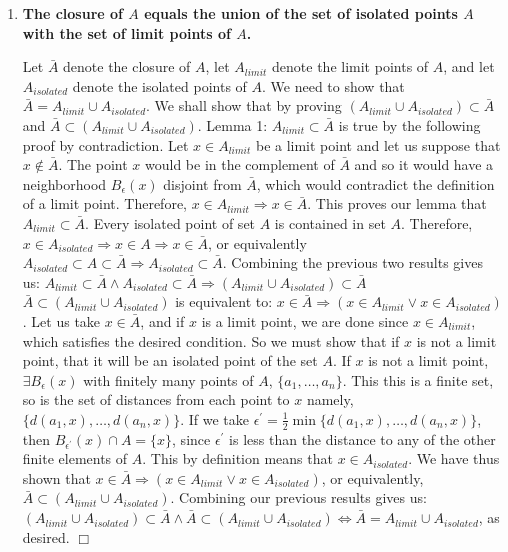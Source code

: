 \documentclass[12pt,letterpaper,reqno]{amsart}
\begin{document}
\begin{enumerate}[1.]
\begin{flushleft}
\end{flushleft}
\item \textbf{The closure of $A$ equals the union of the set of isolated points $A$ with the set of limit points of $A$.}
\begin{flushleft}
    Let $\bar{A}$ denote the closure of $A$, let $A_{limit}$ denote the limit points of $A$, and let $A_{isolated}$ denote the isolated points of $A$. We need to show that $\bar{A} = A_{limit} \cup A_{isolated}$. We shall show that by proving $(A_{limit} \cup A_{isolated}) \subset \bar{A}$ and $\bar{A} \subset (A_{limit} \cup A_{isolated})$. \newline Lemma 1: $A_{limit} \subset \bar{A}$ is true by the following proof by contradiction. Let $x \in A_{limit}$ be a limit point and let us suppose that $x \not\in \bar{A}$. The point $x$ would be in the complement of $\bar{A}$ and so it would have a neighborhood $B_\epsilon(x)$ disjoint from $\bar{A}$, which would contradict the definition of a limit point. Therefore, $x \in A_{limit} \Rightarrow x \in \bar{A}$. This proves our lemma that $A_{limit} \subset \bar{A}$.
    \newline Every isolated point of set $A$ is contained in set $A$. Therefore, $x \in A_{isolated} \Rightarrow x \in A \Rightarrow x \in \bar{A}$, or equivalently $A_{isolated} \subset A \subset \bar{A} \Rightarrow A_{isolated} \subset \bar{A}$. Combining the previous two results gives us: $A_{limit} \subset \bar{A} \wedge A_{isolated} \subset \bar{A} \Rightarrow (A_{limit} \cup A_{isolated}) \subset \bar{A}$
    \newline $\bar{A} \subset (A_{limit} \cup A_{isolated})$ is equivalent to: $x \in \bar{A} \Rightarrow (x \in A_{limit} \vee x \in A_{isolated})$. Let us take $x \in \bar{A}$, and if $x$ is a limit point, we are done since $x \in A_{limit}$, which satisfies the desired condition. So we must show that if $x$ is not a limit point, that it will be an isolated point of the set $A$. If $x$ is not a limit point, $\exists B_\epsilon(x)$ with finitely many points of $A$, $\{a_1, \ldots, a_n\}$. This this is a finite set, so is the set of distances from each point to $x$ namely, $\{d(a_1,x), \ldots, d(a_n, x)\}$. If we take $\epsilon^\prime = \frac{1}{2} \min\{d(a_1,x), \ldots, d(a_n, x)\}$, then $B_{\epsilon^\prime}(x) \cap A = \{x\}$, since $\epsilon^\prime$ is less than the distance to any of the other finite elements of $A$. This by definition means that $x \in A_{isolated}$. We have thus shown that $x \in \bar{A} \Rightarrow (x \in A_{limit} \vee x \in A_{isolated})$, or equivalently, $\bar{A} \subset (A_{limit} \cup A_{isolated})$. Combining our previous results gives us: $(A_{limit} \cup A_{isolated}) \subset \bar{A} \wedge \bar{A} \subset (A_{limit} \cup A_{isolated}) \Leftrightarrow \bar{A} = A_{limit} \cup A_{isolated}$, as desired. $\Box$

\end{flushleft}
\end{enumerate}
\end{document}
